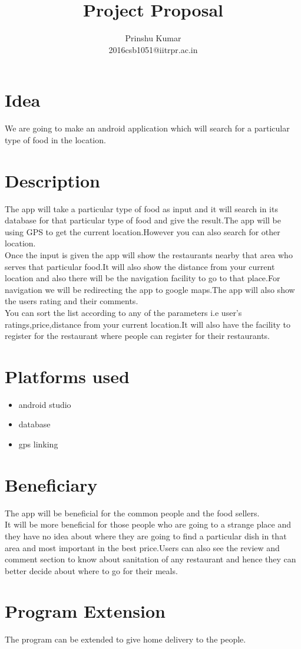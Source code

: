 \documentclass[journal]{IEEEtran}
\begin{document}
\title{Project Proposal}

\author{

Prinshu Kumar\\
2016csb1051@iitrpr.ac.in

}


\maketitle


\section{Idea}
We are going to make an android application which will search for a particular type of food in the location. 
\section{Description}
The app will take a particular type of food as input and it will search in its database for that particular type of food and give the result.The app will be using GPS to get the current location.However you can also search for other location.\\Once the input is given the app will show the restaurants nearby that area who serves that particular food.It will also show the distance from your current location and also there will be the navigation facility to go to that place.For navigation we will be redirecting the app to google maps.The app will also show the users rating and their comments.\\You can sort the list according to any of the parameters i.e user's ratings,price,distance from your current location.It will also have the facility to register for the restaurant where people can register for their restaurants.
\section{Platforms used}
\begin{itemize}
    \item android studio
    \item database
    \item gps linking
\end{itemize}
\section{Beneficiary}
The app will be beneficial for the common people and the food sellers.\\
It will be more beneficial for those people who are going to a strange place and they have no idea about where they are going to find a particular dish in that area and most important in the best price.Users can also see the review and comment section to know about sanitation of any restaurant and hence they can better decide about where to go for their meals.
\section{Program Extension}
The program can be extended to give home delivery to the people.
 
\end{document}
